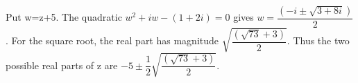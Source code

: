 Put w=z+5. The quadratic $w^2+iw-(1+2i)=0$ gives $w=\dfrac{(-i\pm\sqrt{3+8i})}{2}$. For the square root, the real part has magnitude $\sqrt{\dfrac{(\sqrt{73}+3)}{2}}$. Thus the two possible real parts of z are $\boxed{-5\pm\dfrac{1}{2}\sqrt{\dfrac{(\sqrt{73}+3)}{2}}}$.
